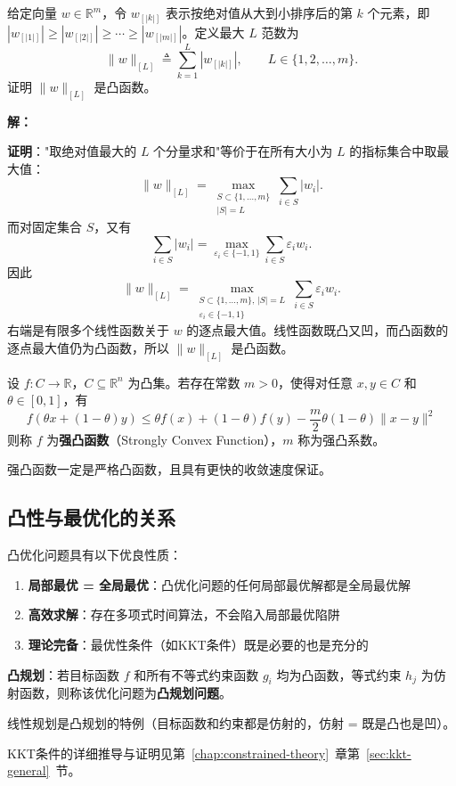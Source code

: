 \begin{example}[最大$L$范数的凸性]\label{ex:max-L-norm}
给定向量 $w \in \mathbb{R}^m$，令 $w_{[|k|]}$ 表示按绝对值从大到小排序后的第 $k$ 个元素，即 $|w_{[|1|]}| \geq |w_{[|2|]}| \geq \cdots \geq |w_{[|m|]}|$。定义最大 $L$ 范数为
\[
\|w\|_{[L]} \triangleq \sum_{k=1}^{L} |w_{[|k|]}|,\qquad L \in \{1,2,\ldots,m\}.
\]
证明 $\|w\|_{[L]}$ 是凸函数。

\textbf{解：}

\textbf{证明}："取绝对值最大的 $L$ 个分量求和"等价于在所有大小为 $L$ 的指标集合中取最大值：
\[
\|w\|_{[L]} = \max_{\substack{S \subset \{1,\ldots,m\} \\ |S|=L}} \sum_{i \in S} |w_i|.
\]
而对固定集合 $S$，又有
\[
\sum_{i \in S} |w_i| = \max_{\varepsilon_i \in \{-1,1\}} \sum_{i \in S} \varepsilon_i w_i.
\]
因此
\[
\|w\|_{[L]} = \max_{\substack{S \subset \{1,\ldots,m\},\, |S|=L \\ \varepsilon_i \in \{-1,1\}}} \sum_{i \in S} \varepsilon_i w_i.
\]
右端是有限多个线性函数关于 $w$ 的逐点最大值。线性函数既凸又凹，而凸函数的逐点最大值仍为凸函数，所以 $\|w\|_{[L]}$ 是凸函数。
\end{example}

\begin{definition}[强凸函数]
设 $f: C \to \mathbb{R}$，$C \subseteq \mathbb{R}^n$ 为凸集。若存在常数 $m > 0$，使得对任意 $x, y \in C$ 和 $\theta \in [0,1]$，有
\[
f(\theta x + (1-\theta) y) \leq \theta f(x) + (1-\theta) f(y) - \frac{m}{2}\theta(1-\theta)\|x - y\|^2
\]
则称 $f$ 为\textbf{强凸函数}（Strongly Convex Function），$m$ 称为强凸系数。

强凸函数一定是严格凸函数，且具有更快的收敛速度保证。
\end{definition}

\subsection{凸性与最优化的关系}

\begin{conceptbox}[为什么凸性如此重要]
凸优化问题具有以下优良性质：
\begin{enumerate}[label=(\arabic*), itemsep=0.3em]
    \item \textbf{局部最优 = 全局最优}：凸优化问题的任何局部最优解都是全局最优解
    \item \textbf{高效求解}：存在多项式时间算法，不会陷入局部最优陷阱
    \item \textbf{理论完备}：最优性条件（如KKT条件）既是必要的也是充分的
\end{enumerate}

\textbf{凸规划}：若目标函数 $f$ 和所有不等式约束函数 $g_i$ 均为凸函数，等式约束 $h_j$ 为仿射函数，则称该优化问题为\textbf{凸规划问题}。

线性规划是凸规划的特例（目标函数和约束都是仿射的，仿射 = 既是凸也是凹）。

KKT条件的详细推导与证明见第~\ref{chap:constrained-theory}~章第~\ref{sec:kkt-general}~节。
\end{conceptbox}


